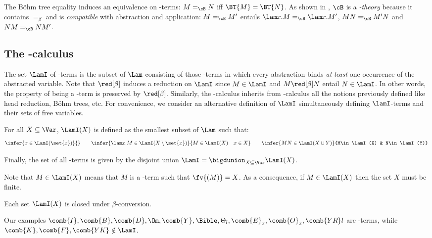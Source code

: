 The B\"ohm tree equality induces an equivalence on \lam-terms: $M =_\cB N$ iff $\BT{M} = \BT{N}$. 
As shown in \cite{Levy76,Wadsworth78}, $\cB$ is a \emph{\lam-theory} because it contains $=_\beta$ and is \emph{compatible} with abstraction and application: $M =_\cB M'$ entails $\lam x.M =_\cB \lam x.M'$, $MN =_\cB M'N$ and $NM =_\cB NM'$.

\subsection{The \lamI-calculus}\label{ssec:lamI}

The set $\LamI$ of \lamI-terms is the subset of $\Lam$ consisting of those \lam-terms 
in which every abstraction binds \emph{at least} one occurrence of the abstracted variable.
Note that  $\red[\beta]$ induces a reduction on $\LamI$ since $M\in\LamI$ and $M \red[\beta] N$ entail $N\in\LamI$. 
In other words, the property of being a \lamI-term is preserved by $\red[\beta]$.
Similarly, the \lamI-calculus inherits from \lam-calculus all the notions previously defined like head reduction, Böhm trees, etc.
For convenience, we consider an alternative definition of $\LamI$ simultaneously defining $\lamI$-terms and their sets of free variables.

\begin{definition}\label{def:LamI}\mbox{}
\bsub
\item For all $X \subseteq \Var$, $\LamI(X)$ is defined as 
	the smallest subset of $\Lam$ such that:
\[
	\infer{x\in\LamI(\set{x})}{}\qquad
	\infer{\lam x.M\in\LamI(X\setminus\set{x})}{M\in\LamI(X)\quad x\in X}\qquad
	\infer{MN\in\LamI(X\cup Y)}{M\in\LamI(X) & N\in\LamI(Y)}
\]
\item Finally, the set of all \lamI-terms is given by 
	the disjoint union
	$\LamI = \bigdunion_{X\subseteq\Var}\LamI(X)$.
\esub
\end{definition}

\begin{remark}\label{rem:aboutLambdaI}\mbox{}
\bsub
\item Note that $M \in \LamI(X)$ means that $M$ is a \lamI-term such that $\fv{(M)}=X$.
As a consequence, if $M\in\LamI(X)$ then the set $X$ must be finite.
\item\label{rem:aboutLambdaI2} 
	Each set $\LamI(X)$ is closed under $\beta$-conversion.
\item Our examples $\comb{I},\comb{B},\comb{D},\Om,\comb{Y},\Bible,\Theta_l,\comb{E}_x,\comb{O}_x,\comb{YR}l$ are \lamI-terms, while $\comb{K},\comb{F},\comb{YK}\notin\LamI$.
\esub
\end{remark}

